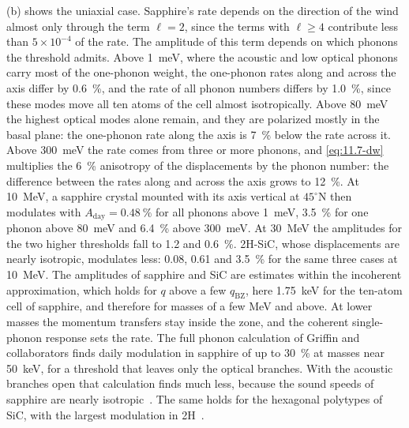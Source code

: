 (b) shows the uniaxial case. Sapphire's rate depends on the direction of the wind almost only through the term $\ell = 2$, since the terms with $\ell \ge 4$ contribute less than $5\times10^{-4}$ of the rate. The amplitude of this term depends on which phonons the threshold admits. Above \SI{1}{meV}, where the acoustic and low optical phonons carry most of the one-phonon weight, the one-phonon rates along and across the axis differ by \SI{0.6}{\percent}, and the rate of all phonon numbers differs by \SI{1.0}{\percent}, since these modes move all ten atoms of the cell almost isotropically. Above \SI{80}{meV} the highest optical modes alone remain, and they are polarized mostly in the basal plane: the one-phonon rate along the axis is \SI{7}{\percent} below the rate across it. Above \SI{300}{meV} the rate comes from three or more phonons, and \cref{eq:11.7-dw} multiplies the \SI{6}{\percent} anisotropy of the displacements by the phonon number: the difference between the rates along and across the axis grows to \SI{12}{\percent}. At \SI{10}{MeV}, a sapphire crystal mounted with its axis vertical at $45^\circ$N then modulates with $A_{\mathrm{day}} = \SI{0.48}{\percent}$ for all phonons above \SI{1}{meV}, \SI{3.5}{\percent} for one phonon above \SI{80}{meV} and \SI{6.4}{\percent} above \SI{300}{meV}. At \SI{30}{MeV} the amplitudes for the two higher thresholds fall to 1.2 and \SI{0.6}{\percent}. 2H-SiC, whose displacements are nearly isotropic, modulates less: 0.08, 0.61 and \SI{3.5}{\percent} for the same three cases at \SI{10}{MeV}. The amplitudes of sapphire and SiC are estimates within the incoherent approximation, which holds for $q$ above a few $q_{\mathrm{BZ}}$, here \SI{1.75}{keV} for the ten-atom cell of sapphire, and therefore for masses of a few MeV and above. At lower masses the momentum transfers stay inside the zone, and the coherent single-phonon response sets the rate. The full phonon calculation of Griffin and collaborators finds daily modulation in sapphire of up to \SI{30}{\percent} at masses near \SI{50}{keV}, for a threshold that leaves only the optical branches. With the acoustic branches open that calculation finds much less, because the sound speeds of sapphire are nearly isotropic~\cite[Sects.~III\,C and IV\,C]{griffin2018directional}. The same holds for the hexagonal polytypes of SiC, with the largest modulation in 2H~\cite[Sects.~IV\,B and V]{griffin2021sic}.


